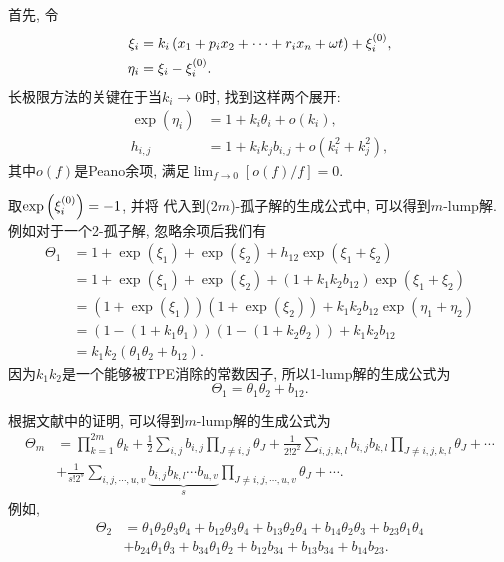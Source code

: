 首先, 令
\begin{equation}
\begin{split}
    \xi_i&=k_i\left(x_1+p_ix_2+\cdots+r_ix_n+\omega t\right)+\xi_i^{(0)},\\
    \eta_i&=\xi_i-\xi_i^{(0)}.
\end{split}
\end{equation}
长极限方法的关键在于当$k_i\rightarrow 0$时, 找到这样两个展开:
\begin{equation}
\begin{split}
    \exp(\eta_i)&=1+k_i \theta_i+o(k_i), \\ 
    h_{i,j}&=1+k_ik_jb_{i,j}+o(k_i^2+k_j^2),
\end{split} \label{lump-expansion}
\end{equation}
其中$o(f)$是Peano余项, 满足$\lim_{f\rightarrow 0}[o(f)/f]=0$.

取$\exp\left(\xi_i^{(0)}\right)=-1$, 并将 代入到($2m$)-孤子解的生成公式中, 可以得到$m$-lump解. 例如对于一个2-孤子解, 忽略余项后我们有
\begin{equation}
\begin{split}
\Theta_1&=1+\exp(\xi_1)+\exp(\xi_2)+h_{12}\exp(\xi_1+\xi_2) \\ 
&= 1+\exp(\xi_1)+\exp(\xi_2)+(1+k_1k_2b_{12})\exp(\xi_1+\xi_2) \\ 
&=(1+\exp(\xi_1))(1+\exp(\xi_2))+k_1k_2b_{12}\exp(\eta_1+\eta_2) \\ 
&=(1-(1+k_1\theta_1))(1-(1+k_2\theta_2))+k_1k_2b_{12} \\
&=k_1k_2(\theta_1\theta_2+b_{12}).
\end{split}
\end{equation}
因为$k_1k_2$是一个能够被TPE消除的常数因子, 所以1-lump解的生成公式为
\begin{equation}
    \Theta_1=\theta_1\theta_2+b_{12}.
\end{equation}

根据文献\cite{satsuma1979two}中的证明, 可以得到$m$-lump解的生成公式为
\begin{equation}
\begin{split}
    \Theta_m&=\prod_{k=1}^{2m}\theta_k+\frac{1}{2}\sum_{i,j}{b_{i,j}}\prod_{J\neq i,j}{\theta_J}+\frac{1}{2! 2^2}\sum_{i,j,k,l}{b_{i,j}b_{k,l}}\prod_{J\neq i,j,k,l}{\theta_{J}}+\cdots \\
    &+\frac{1}{s!2^s}\sum_{i,j,\cdots,u,v}\underbrace{{b_{i,j}b_{k,l}\cdots b_{u,v}}}_{s}\prod_{J\neq i,j,\cdots, u,v}{\theta_J}+\cdots. \label{f-lump-old}
\end{split}
\end{equation}
例如, 
\begin{equation}
\renewcommand{\t}[1]{\theta_{#1}}
\renewcommand{\b}[1]{b_{#1}}
\begin{split}
\Theta_2&=\t{1}\t{2}\t{3}\t{4}+\b{12}\t{3}\t{4}+\b{13}\t{2}\t{4}+\b{14}\t{2}\t{3}+\b{23}\t{1}\t{4}\\
&+\b{24}\t{1}\t{3}+\b{34}\t{1}\t{2}+\b{12}\b{34}+\b{13}\b{34}+\b{14}\b{23}.
\end{split}
\end{equation}

